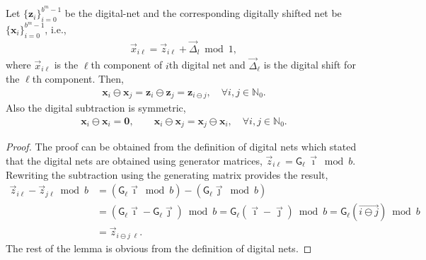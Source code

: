 \documentclass{svjour3}                     %
\newcommand{\bm}[1]{\boldsymbol{#1}}
\newcommand{\naturals}{\mathbb{N}}
\newcommand{\vx}{\bm{x}}
\newcommand{\vz}{\bm{z}}
\newcommand{\mG}{\mathsf{G}}
\begin{document}
\begin{lemma}
	\label{lemma:digital_net_prop}
	Let $\{\vz_i\}_{i=0}^{b^{m}-1}$ be the digital-net and the corresponding digitally shifted net be $\{\vx_i\}_{i=0}^{b^{m}-1}$, i.e.,
	\begin{align*}
	\vec{x}_{i \ell} = \vec{z}_{i \ell} + \vec{\Delta}_l \bmod 1,
	\end{align*}
	where $\vec{x}_{i \ell}$ is the $\ell$th component of $i$th digital net and $\vec{\Delta}_{\ell}$ is the digital shift for the $\ell$th component. 
	Then,
	\begin{align}
	\label{eqn:digital_shift_prop}
	\vx_i \ominus \vx_j = \vz_i \ominus \vz_j = \vz_{i \ominus j}, \quad \forall i,j \in \naturals_0. 
	\end{align}
	Also the digital subtraction is symmetric,
	\begin{align}
	\label{eqn:digital_net_symmetric_prop}
	\vx_i \ominus \vx_i = \boldsymbol{ 0}, \qquad 
	\vx_i \ominus \vx_j = \vx_j \ominus \vx_i, \quad \forall i,j \in \naturals_0.
	\end{align}
\end{lemma}

\begin{proof}
	
	The proof can be obtained from the definition of digital nets which stated that the digital nets are obtained using generator matrices, $\vec{z}_{i \ell} = \mG_{\ell} \, \vec{\imath} \bmod b$. Rewriting the subtraction using the generating matrix provides the result,
	\begin{align*}
	\vec{z}_{i \ell} - \vec{z}_{j\ell} \bmod b & = (\mG_{\ell} \vec{\imath} \bmod b) - (\mG_{\ell} \vec{\jmath} \bmod b) \\
	& = (\mG_{\ell} \vec{\imath} - \mG_{\ell} \vec{\jmath} ) \bmod b 
	  = \mG_{\ell} (\vec{\imath} - \vec{\jmath} ) \bmod b 
	  = \mG_{\ell} (\overrightarrow{i \ominus j} ) \bmod b \\
	& = \vec{z}_{i \ominus j \; {\ell}}.
	\end{align*}
	The rest of the lemma is obvious from the definition of digital nets.
\end{proof}
\end{document}
